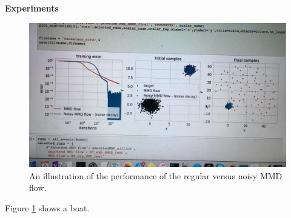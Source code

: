 %
%
%
% 
%
%
%
\textbf{Experiments}


\begin{figure}[ht]
	\centering
	\includegraphics[width=0.5\linewidth]{experiments.jpg}
	\caption{An illustration of the performance of the regular versus noisy MMD flow.}
	\label{fig:experiments}
\end{figure}

Figure \ref{fig:experiments} shows a boat.









